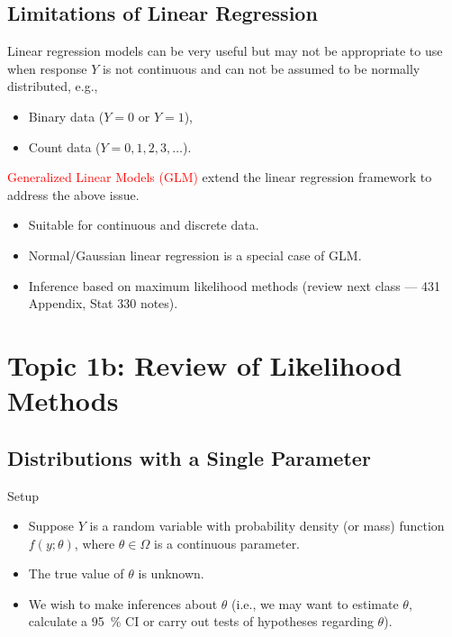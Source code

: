 \documentclass{article}\usepackage[]{graphicx}\usepackage[svgnames]{xcolor}
\newcommand{\makeheading}[2]%
{%
\begin{center}%
    \makebox[\linewidth]{\raisebox{-.5ex}[0cm][0cm]{\stackanchor{\textcolor{Gray}{\textsc{#1}}}{\scriptsize\itshape\printyearoff#2}\;}\color{Crimson!50}\hrulefill}%
\end{center}%
}%
\begin{document}
\subsection*{Limitations of Linear Regression}
Linear regression models can be very useful but may not be appropriate to use
when response $ Y $ is not continuous and can not be assumed to be normally
distributed, e.g.,
\begin{itemize}
      \item Binary data ($ Y=0 $ or $ Y=1 $),
      \item Count data ($ Y=0,1,2,3,\ldots $).
\end{itemize}
\textcolor{Red}{Generalized Linear Models (GLM)} extend the linear regression framework to
address the above issue.
\begin{itemize}
      \item Suitable for continuous and discrete data.
      \item Normal/Gaussian linear regression is a special case of GLM.
      \item Inference based on maximum likelihood methods (review next class --- 431
            Appendix, Stat 330 notes).
\end{itemize}

\makeheading{Week 2}{\daterange{2021-09-13}{2021-09-17}}
\section*{Topic 1b: Review of Likelihood Methods}
\subsection*{Distributions with a Single Parameter}
\begin{Regular}{Setup}
      \begin{itemize}
            \item Suppose $ Y $ is a random variable with probability density (or mass) function
                  $ f(y;\theta) $, where $ \theta\in\Omega $ is a continuous parameter.
            \item The true value of $ \theta $ is unknown.
            \item We wish to make inferences about $ \theta $ (i.e., we may want to estimate $ \theta $, calculate
                  a \qty{95}{\percent} CI or carry out tests of hypotheses regarding $ \theta $).
      \end{itemize}
\end{Regular}
\end{document}
